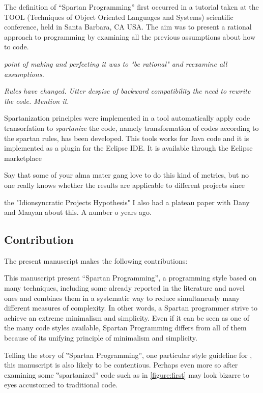 The definition of ``Spartan Programming'' first occurred in a tutorial taken at 
the TOOL (Techniques of Object Oriented Languages and Systems) scientific conference, 
held in Santa Barbara, CA USA. %
The aim was to present a rational approach to programming by examining all the previous 
assumptions about how to code.

\emph{point of making and perfecting it was to "be rational" and
reexamine all assumptions.}

\emph{Rules have changed.
Utter despise of backward compatibility the need to rewrite the code.
Mention it.} 


Spartanization principles were implemented in a tool automatically apply code transorfation 
to \emph{spartanize} the code, namely transformation of codes according to the spartan rules, has been developed.
This tools works for Java code and it is implemented as a plugin for the Eclipse 
IDE. It is available through the Eclipse marketplace

Say that some of your alma mater gang love to do this kind of metrics, but
no one really knows whether the results are applicable to different projects
since \cite{Turnu:Concas:Marchesi:Tonelli:11}

the "Idionsyncratic Projects Hypothesis" I also had a plateau paper with
Dany and Maayan about this. A number o years ago.


\subsection{Contribution}

The present manuscript makes the following contributions:

This manuscript present ``Spartan Programming'', a programming style based on many techniques,
including some already reported in the literature and novel ones and combines them 
in a systematic way to reduce simultaneusly many different measures of complexity.
In other words, a Spartan programmer strive to achieve an extreme minimalism and simplicity.
Even if it can be seen as one of the many code styles available, Spartan Programming differs from
all of them because of its unifying principle of minimalism and simplicity.


Telling the story of ‟Spartan Programming”, one particular style guideline for
\Java, this manuscript is also likely to be contentious. Perhaps even more so
after examining some ‟spartanized” code such as in \cref{figure:first} 
may look bizarre to eyes accustomed to traditional \Java code.

